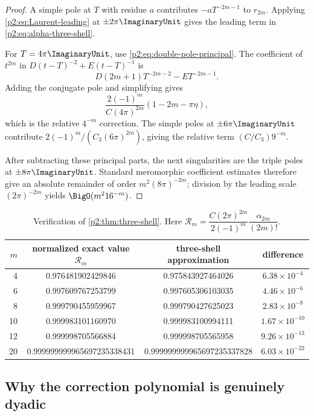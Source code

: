 \documentclass[11pt,oneside]{article}
\numberwithin{equation}{section}
\theoremstyle{definition}
\theoremstyle{remark}
\begin{document}
\begin{proof}
A simple pole at $T$ with residue $a$ contributes $-aT^{-2m-1}$ to $r_{2m}$.  Applying
\eqref{p2:eq:Laurent-leading} at $\pm2\pi\ImaginaryUnit$ gives the leading term in
\eqref{p2:eq:alpha-three-shell}.

For $T=4\pi\ImaginaryUnit$, use \eqref{p2:eq:double-pole-principal}.  The coefficient of $t^{2m}$ in
$D(t-T)^{-2}+E(t-T)^{-1}$ is
\[
 D(2m+1)T^{-2m-2}-ET^{-2m-1}.
\]
Adding the conjugate pole and simplifying gives
\[
 \frac{2(-1)^m}{C(4\pi)^{2m}}(1-2m-\pi\eta),
\]
which is the relative $4^{-m}$ correction.  The simple poles at $\pm6\pi\ImaginaryUnit$ contribute
$2(-1)^m/(C_3(6\pi)^{2m})$, giving the relative term $(C/C_3)9^{-m}$.

After subtracting these principal parts, the next singularities are the triple poles at
$\pm8\pi\ImaginaryUnit$.  Standard meromorphic coefficient estimates therefore give an absolute remainder
of order $m^2(8\pi)^{-2m}$; division by the leading scale $(2\pi)^{-2m}$ yields
$\BigO(m^2 16^{-m})$.
\end{proof}

\begin{table}[htbp]
\centering
\small
\begin{tabular}{@{}rccc@{}}
\toprule
$m$ & normalized exact value $\mathcal R_m$ & three-shell approximation & difference \\
\midrule
4  & 0.976481902429846 & 0.975843927464026 & $6.38\times10^{-4}$ \\
6  & 0.997609767253799 & 0.997605306103035 & $4.46\times10^{-6}$ \\
8  & 0.999790455959967 & 0.999790427625023 & $2.83\times10^{-8}$ \\
10 & 0.999983101160970 & 0.999983100994111 & $1.67\times10^{-10}$ \\
12 & 0.999998705566884 & 0.999998705565958 & $9.26\times10^{-13}$ \\
20 & 0.999999999965697235338431 & 0.999999999965697235337828 & $6.03\times10^{-22}$ \\
\bottomrule
\end{tabular}
\caption{Verification of \cref{p2:thm:three-shell}.  Here
$\mathcal R_m=\dfrac{C(2\pi)^{2m}}{2(-1)^m}\dfrac{\alpha_{2m}}{(2m)!}$.}
\label{p2:tab:three-shell}
\end{table}

\subsection{Why the correction polynomial is genuinely dyadic}
\end{document}
